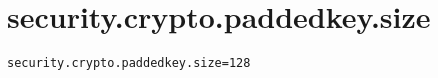 \section{security.crypto.paddedkey.size}
\label{configuration:SecurityCryptoPaddedkeySize}
\ClearAPI
\TODO
{}
\begin{lstlisting}[style=Props,caption={Usage example for \textit{security.crypto.paddedkey.size}}]
security.crypto.paddedkey.size=128
\end{lstlisting}